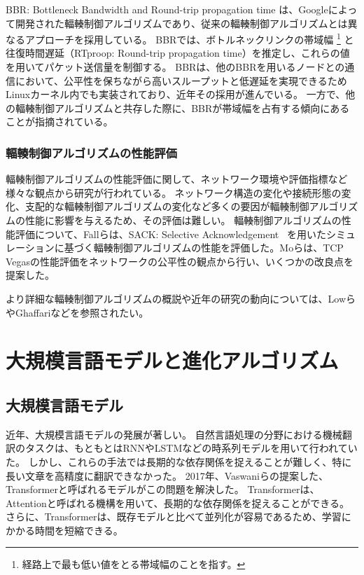 \documentclass[a4paper,11pt]{jreport}
\begin{document}
BBR: Bottleneck Bandwidth and Round-trip propagation time は、Googleによって開発された輻輳制御アルゴリズムであり、従来の輻輳制御アルゴリズムとは異なるアプローチを採用している。
BBRでは、ボトルネックリンクの帯域幅
\footnote{経路上で最も低い値をとる帯域幅のことを指す。}
と往復時間遅延（RTproop: Round-trip propagation time）を推定し、これらの値を用いてパケット送信量を制御する。
BBRは、他のBBRを用いるノードとの通信において、公平性を保ちながら高いスループットと低遅延を実現できるためLinuxカーネル内でも実装されており、近年その採用が進んでいる。
一方で、他の輻輳制御アルゴリズムと共存した際に、BBRが帯域幅を占有する傾向にあることが指摘されている。

\subsubsection*{輻輳制御アルゴリズムの性能評価}

輻輳制御アルゴリズムの性能評価に関して、ネットワーク環境や評価指標など様々な観点から研究が行われている。
ネットワーク構造の変化や接続形態の変化、支配的な輻輳制御アルゴリズムの変化など多くの要因が輻輳制御アルゴリズムの性能に影響を与えるため、その評価は難しい。
輻輳制御アルゴリズムの性能評価について、Fallら\cite{fall1996simulation}は、SACK: Selective Acknowledgement ~\cite{rfc2018}を用いたシミュレーションに基づく輻輳制御アルゴリズムの性能を評価した。Moら\cite{752178}は、TCP Vegasの性能評価をネットワークの公平性の観点から行い、いくつかの改良点を提案した。

より詳細な輻輳制御アルゴリズムの概説や近年の研究の動向については、Lowら\cite{980245}やGhaffari\cite{GHAFFARI2015101}などを参照されたい。

\section{大規模言語モデルと進化アルゴリズム}

\subsection{大規模言語モデル}

近年、大規模言語モデルの発展が著しい。
自然言語処理の分野における機械翻訳のタスクは、もともとはRNN\cite{graves2014generating}やLSTM\cite{6795963}などの時系列モデルを用いて行われていた。
しかし、これらの手法では長期的な依存関係を捉えることが難しく、特に長い文章を高精度に翻訳できなかった。
2017年、Vaswaniら\cite{attention}の提案した、Transformerと呼ばれるモデルがこの問題を解決した。
Transformerは、Attentionと呼ばれる機構を用いて、長期的な依存関係を捉えることができる。
さらに、Transformerは、既存モデルと比べて並列化が容易であるため、学習にかかる時間を短縮できる。
\end{document}
